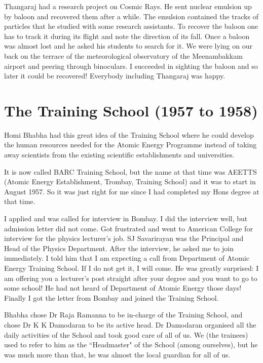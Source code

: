 Thangaraj had a research project on Cosmic Rays. He sent nuclear 
emulsion up by baloon and recovered them after a while. The emulsion 
contained the tracks of particles that he studied with some research 
assistants. To recover the baloon one has to track it during its flight 
and note the direction of its fall. Once a baloon was almost lost and he 
asked his students to search for it. We were lying on our back on the 
terrace of the meteorological observatory of the Meenambakkam airport 
and peering through binoculars. I succeeded in sighting the baloon and 
so later it could be recovered! Everybody including Thangaraj was happy.

\section*{The Training School (1957 to 1958)}

  Homi Bhabha had this great idea of the Training School where he could
  develop the human resources needed for the Atomic Energy Programme
  instead of taking away scientists from the existing scientific establishments
  and universities.   

  It is now called BARC Training School, but the name at that
  time was AEETTS (Atomic Energy Establishment, Trombay, Training School)
  and it was to start in August 1957. So it was just right for me since I
  had completed my Hons degree at that time.

I applied and was called for interview in Bombay. I did the interview 
well, but admission letter did not come. Got frustrated and went to 
American College for interview for the physics lecturer's job. SJ 
Savarirayan was the Principal and Head of the Physics Department. After 
the interview, he asked me to join immediately. I told him that I am 
expecting a call from Department of Atomic Energy Training School. If I 
do not get it, I will come. He was greatly surprised: I am offering you 
a lecturer's post straight after your degree and you want to go to some 
school! He had not heard of Department of Atomic Energy those days! 
Finally I got the letter from Bombay and joined the Training School.

  Bhabha chose Dr Raja Ramanna to be in-charge of the Training School,
  and chose Dr K K Damodaran to be its active head.
  Dr Damodaran organised all the daily activities of the
  School and took good care of all of us. We (the trainees)
  used to refer to him as the ``Headmaster" of the School (among
  ourselves), but he was much more than that, he was almost
  the local guardian for all of us.

